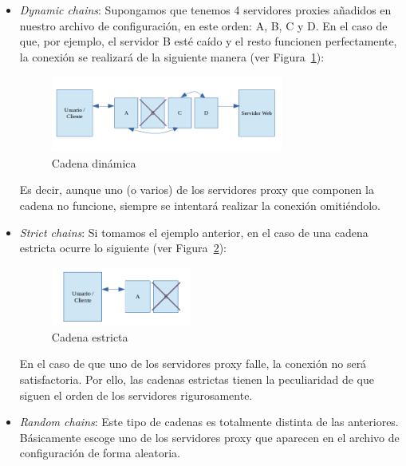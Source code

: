\begin{itemize}
	\item \textit{Dynamic chains}: Supongamos que tenemos 4 servidores proxies añadidos en nuestro archivo de configuración, en este orden: A, B, C y D.
	En el caso de que, por ejemplo, el servidor B esté caído y el resto funcionen perfectamente, la conexión se realizará de la siguiente manera (ver Figura~\ref{fig:dyn_chain}):
	
	\begin{figure}[H]
		\centerline{
			\mbox{\includegraphics[width=3.00in]{images/proxy_dynamic.png}}
		}
		\caption{Cadena dinámica}
		\label{fig:dyn_chain}
	\end{figure}
		
	Es decir, aunque uno (o varios) de los servidores proxy que componen la cadena no funcione, siempre se intentará realizar la conexión omitiéndolo.
	
	\item \textit{Strict chains}: Si tomamos el ejemplo anterior, en el caso de una cadena estricta ocurre lo siguiente (ver Figura~\ref{fig:strict_chain}):
	
	\begin{figure}[H]
		\centerline{
			\mbox{\includegraphics[width=1.80in]{images/proxy_strict.png}}
		}
		\caption{Cadena estricta}
		\label{fig:strict_chain}
	\end{figure}
			
	En el caso de que uno de los servidores proxy falle, la conexión no será satisfactoria. Por ello, las cadenas estrictas tienen la peculiaridad de que siguen el orden de los servidores rigurosamente.
	
	\item \textit{Random chains}: Este tipo de cadenas es totalmente distinta de las anteriores. Básicamente escoge uno de los servidores proxy que aparecen en el archivo de configuración de forma aleatoria.
\end{itemize}

